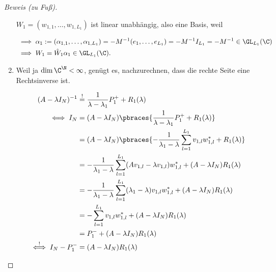 \begin{proof}[Beweis (zu Fuß)]
\begin{enumerate}[label = (\roman*)]
        $W_1 = (w_{1, 1}, \dots, w_{1, L_1})$ ist linear unabhängig, also eine Basis, weil

        \begin{align*}
            & \implies
            \alpha_1
            :=
            (\alpha_{1, 1}, \dots, \alpha_{1, L_1})
            =
            -M^{-1} (e_1, \dots, e_{L_1})
            =
            -M^{-1} I_{L_1}
            =
            -M^{-1}
            \in
            \GL_{L_1}(\C) \\
            & \implies
            W_1
            =
            \hat W_1 \alpha_1
            \in
            \GL_{L_1}(\C).
        \end{align*}

        \item Weil ja $\dim \C^\N < \infty$, genügt es, nachzurechnen, dass die rechte Seite eine Rechtsinverse ist.
        
        \begin{align*}
            (A - \lambda I_N)^{-1}
            & \stackrel{!}{=}
            \frac{1}{\lambda - \lambda_1} P_1^+
            +
            R_1(\lambda) \\
            \iff
            I_N
            & =
            (A - \lambda I_N)
            \pbraces
            {
                \frac{1}{\lambda - \lambda_1} P_1^+
                +
                R_1(\lambda)
            } \\
            & =
            (A - \lambda I_N)
            \pbraces
            {
                -\frac{1}{\lambda_1 - \lambda}
                \sum_{l=1}^{L_1}
                    v_{1, l} w_{1, l}^\ast
                +
                R_1(\lambda)
            } \\
            & =
            -\frac{1}{\lambda_1 - \lambda}
            \sum_{l=1}^{L_1}
                (
                    A v_{1, l}
                    -
                    \lambda v_{1, l}
                )
                w_{1, l}^\ast
            +
            (A - \lambda I_N) R_1(\lambda) \\
            & =
            -\frac{1}{\lambda_1 - \lambda}
            \sum_{l=1}^{L_1}
                (\lambda_1 - \lambda) v_{1, l} w_{1, l}^\ast
            +
            (A - \lambda I_N)
            R_1(\lambda) \\
            & =
            -\sum_{l=1}^{L_1}
                v_{1, l} w_{1, l}^\ast
            +
            (A - \lambda I_N)
            R_1(\lambda) \\
            & =
            P_1^-
            +
            (A - \lambda I_N)
            R_1(\lambda) \\
            \stackrel{!}{\iff}
            I_N - P_1^-
            & =
            (A - \lambda I_N) R_1(\lambda)
        \end{align*}


\end{enumerate}
\end{proof}
